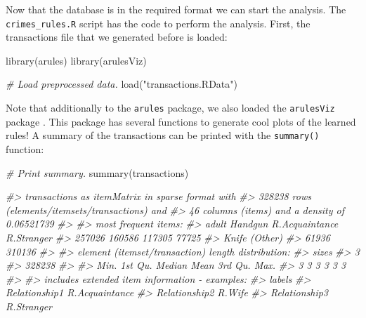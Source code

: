 \documentclass[
  11pt,
]{krantz}
\newenvironment{Shaded}{\begin{snugshade}}{\end{snugshade}}
\newcommand{\CommentTok}[1]{\textcolor[rgb]{0.37,0.37,0.37}{\textit{#1}}}
\newcommand{\FunctionTok}[1]{\textcolor[rgb]{0,0,0}{#1}}
\newcommand{\NormalTok}[1]{#1}
\newcommand{\StringTok}[1]{\textcolor[rgb]{0.5,0.5,0.5}{#1}}
\begin{document}
Now that the database is in the required format we can start the analysis. The \texttt{crimes\_rules.R} script has the code to perform the analysis. First, the transactions file that we generated before is loaded:

\begin{Shaded}
\begin{Highlighting}[]
\FunctionTok{library}\NormalTok{(arules)}
\FunctionTok{library}\NormalTok{(arulesViz)}

\CommentTok{\# Load preprocessed data.}
\FunctionTok{load}\NormalTok{(}\StringTok{"transactions.RData"}\NormalTok{)}
\end{Highlighting}
\end{Shaded}

Note that additionally to the \texttt{arules} package, we also loaded the \texttt{arulesViz} package \citep{ParulesViz}. This package has several functions to generate cool plots of the learned rules! A summary of the transactions can be printed with the \texttt{summary()} function:

\begin{Shaded}
\begin{Highlighting}[]
\CommentTok{\# Print summary.}
\FunctionTok{summary}\NormalTok{(transactions)}

\CommentTok{\#\textgreater{} transactions as itemMatrix in sparse format with}
\CommentTok{\#\textgreater{} 328238 rows (elements/itemsets/transactions) and}
\CommentTok{\#\textgreater{} 46 columns (items) and a density of 0.06521739 }
\CommentTok{\#\textgreater{} }
\CommentTok{\#\textgreater{} most frequent items:}
\CommentTok{\#\textgreater{}   adult        Handgun R.Acquaintance     R.Stranger }
\CommentTok{\#\textgreater{} 257026         160586         117305          77725 }
\CommentTok{\#\textgreater{} Knife        (Other) }
\CommentTok{\#\textgreater{} 61936         310136 }
\CommentTok{\#\textgreater{} }
\CommentTok{\#\textgreater{} element (itemset/transaction) length distribution:}
\CommentTok{\#\textgreater{}   sizes}
\CommentTok{\#\textgreater{} 3 }
\CommentTok{\#\textgreater{} 328238 }
\CommentTok{\#\textgreater{} }
\CommentTok{\#\textgreater{} Min. 1st Qu.  Median    Mean 3rd Qu.    Max. }
\CommentTok{\#\textgreater{} 3       3       3       3       3       3 }
\CommentTok{\#\textgreater{} }
\CommentTok{\#\textgreater{} includes extended item information {-} examples:}
\CommentTok{\#\textgreater{}   labels}
\CommentTok{\#\textgreater{} Relationship1 R.Acquaintance}
\CommentTok{\#\textgreater{} Relationship2         R.Wife}
\CommentTok{\#\textgreater{} Relationship3     R.Stranger}
\end{Highlighting}
\end{Shaded}
\end{document}
